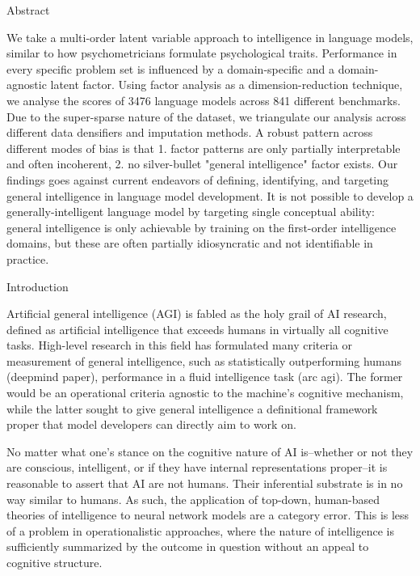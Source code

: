 
Abstract

We take a multi-order latent variable approach to intelligence in language models, similar to how psychometricians formulate psychological traits. Performance in every specific problem set is influenced by a domain-specific and a domain-agnostic latent factor. Using factor analysis as a dimension-reduction technique, we analyse the scores of 3476 language models across 841 different benchmarks. Due to the super-sparse nature of the dataset, we triangulate our analysis across different data densifiers and imputation methods. A robust pattern across different modes of bias is that 1. factor patterns are only partially interpretable and often incoherent, 2. no silver-bullet "general intelligence" factor exists. Our findings goes against current endeavors of defining, identifying, and targeting general intelligence in language model development. It is not possible to develop a generally-intelligent language model by targeting single conceptual ability: general intelligence is only achievable by training on the first-order intelligence domains, but these are often partially idiosyncratic and not identifiable in practice.

Introduction

Artificial general intelligence (AGI) is fabled as the holy grail of AI research, defined as artificial intelligence that exceeds humans in virtually all cognitive tasks. High-level research in this field has formulated many criteria or measurement of general intelligence, such as statistically outperforming humans (deepmind paper), performance in a fluid intelligence task (arc agi). The former would be an operational criteria agnostic to the machine's cognitive mechanism, while the latter sought to give general intelligence a definitional framework proper that model developers can directly aim to work on.


No matter what one's stance on the cognitive nature of AI is--whether or not they are conscious, intelligent, or if they have internal representations proper--it is reasonable to assert that AI are not humans. Their inferential substrate is in no way similar to humans. As such, the application of top-down, human-based theories of intelligence to neural network models are a category error. This is less of a problem in operationalistic approaches, where the nature of intelligence is sufficiently summarized by the outcome in question without an appeal to cognitive structure.

